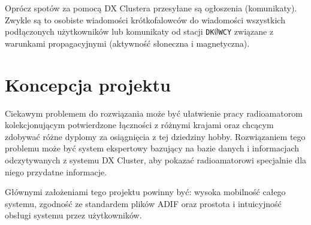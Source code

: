 \documentclass[]{mgr}
\begin{document}
        Oprócz spotów za pomocą DX Clustera przesyłane są ogłoszenia (komunikaty). Zwykle są to osobiste wiadomości krótkofalowców do wiadomości wszystkich podłączonych użytkowników lub komunikaty od stacji \texttt{DK$\emptyset$WCY} związane z warunkami propagacyjnymi (aktywność słoneczna i magnetyczna).

        \section{Koncepcja projektu}
        \label{sec:problem_description}
        Ciekawym problemem do rozwiązania może być ułatwienie pracy radioamatorom kolekcjonującym potwierdzone łączności z różnymi krajami oraz chcącym zdobywać różne dyplomy za osiągnięcia z tej dziedziny hobby. Rozwiązaniem tego problemu może być system ekspertowy bazujący na bazie danych i informacjach odczytywanych z systemu DX Cluster, aby pokazać radioamatorowi specjalnie dla niego przydatne informacje.

        Głównymi założeniami tego projektu powinny być: wysoka mobilność całego systemu, zgodność ze standardem plików ADIF oraz prostota i intuicyjność obsługi systemu przez użytkowników.
\end{document}

